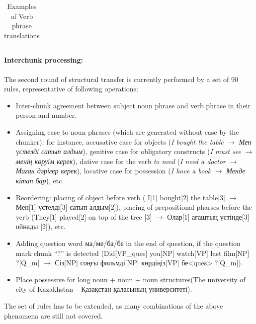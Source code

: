 \documentclass[11pt]{article}
\begin{document}
\begin{table}
\begin{tabular}{|l|l|l|l|}
     
  \end{tabular}
  \caption{Examples of Verb phrase translations}
  \label{table:vps}
\end{table}

\paragraph{Interchunk processing:}

The second round of structural transfer is currently performed by a %
set of 90 rules, representative of following operations:
\begin{itemize}
\item Inter-chunk agreement between subject noun phrase and verb phrase in their person and number.
\item Assigning case to noun phrases (which are generated without case by the chunker): for instance, 
  accusative case for objects (\emph{I bought the table} $\rightarrow$ \emph{Мен үстелді  сатып алдым}), genitive case for 
  obligatory constructs (\emph{I must see} $\rightarrow$ \emph{менің көруім керек}),  dative case for the verb \emph{to 
  need} (\emph{I need a doctor} $\rightarrow$ \emph{Маған дәрігер керек}), locative case for 
  possession (\emph{I have a book} $\rightarrow$ \emph{Менде кітап бар}), etc.\ 
\item Reordering: placing of object before verb ( I[1] bought[2] the table[3] $\rightarrow$ Мен[1] үстелді[3] сатып алдым[2]), 
  placing of prepositional pharses before the verb  (They[1] played[2] on top of the tree [3] $\rightarrow$ Олар[1] ағаштың үстінде[3] ойнады [2]), etc.\ 
\item Adding question word ма/ме/ба/бе in the end of question, if the question mark chunk ``?'' is detected (Did[VP\_ques] you[NP] watch[VP] last film[NP] ?[Q\_m] $\rightarrow$ Сіз[NP] соңғы фильмді[NP] көрдіңіз[VP] бе<ques> ?[Q\_m]).
\item Place possessive for long noun + noun + noun structures(The university of city of Kazakhstan -- Қазақстан қаласының университеті).
\end{itemize}

The set of rules has to be extended, as many combinations of the above phenomena are still not covered.
\end{document}
